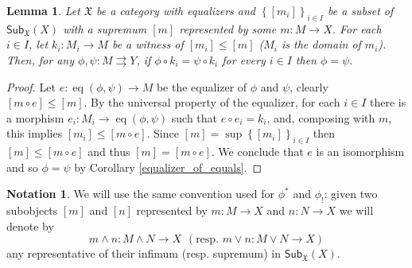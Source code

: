 \documentclass[12pt]{article}
\newtheorem{lemma}{Lemma}[section]
\theoremstyle{definition}
\newtheorem*{notaz}{Notation}
\def\X{\mathfrak X}
\DeclareMathOperator{\eq}{eq}
\numberwithin{equation}{section}
\newcommand{\catname}[1]{\mathbf{#1}}
\newcommand{\sub}[1]{\mathsf{Sub}_{\catname{#1}}}
\begin{document}
\begin{lemma}\label{jointly_epic} Let $\X$ be a category with equalizers and $\left\{[m_i]\right\}_{i\in I}$ be a subset of $\sub{\X}(X)$ with a supremum $[m]$ represented by some $m\colon M\rightarrow X$. For each $i\in I$, let $k_i\colon M_i\rightarrow M$ be a witness of $[m_i]\leq [m]$ ($M_i$ is the domain of $m_i$). Then, for any $\phi,\psi:M\rightrightarrows Y$,  if $\phi\circ k_i=\psi\circ k_i$ for every $i\in I$ then $\phi=\psi$.
\end{lemma}
\begin{proof} Let $e\colon \eq(\phi,\psi)\rightarrow M$ be the equalizer of $\phi$ and $\psi$, clearly $[m\circ e]\leq [m]$. By the universal property of the equalizer, for each $i\in I$ there is a morphism $e_i\colon M_i\to \eq(\phi,\psi)$ such that $e\circ e_i=k_i$, and, composing with $m$, this implies $[m_i]\leq [m\circ e]$. Since $[m]=\sup\left\{[m_i]\right\}_{i\in I}$ then $[m]\leq [m\circ e]$ and thus $[m]=[m\circ e]$. We conclude that $e$ is an isomorphism and so $\phi=\psi$ by Corollary \ref{equalizer_of_equals}.
\end{proof}

\begin{notaz}We will use the same convention used for $\phi^*$ and $\phi_!$: given two subobjects $[m]$ and $[n]$ represented by $m:M\rightarrow X$ and $n:N\rightarrow X$ we will denote by
	\[
	m\wedge n: M\wedge N\rightarrow X \hspace{5pt}(\text{resp. } m\vee n:M\vee N\rightarrow X)
	\]
any representative of their infimum (resp. supremum) in $\sub{\X}(X)$.
\end{notaz}
\end{document}
